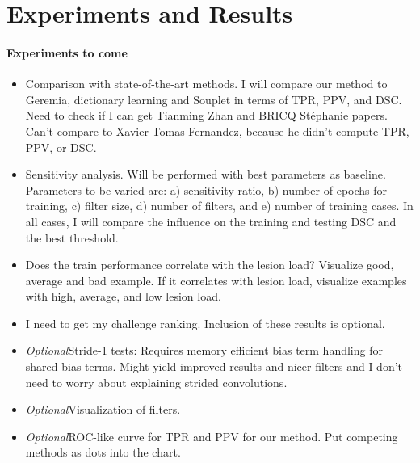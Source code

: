 %

\section{Experiments and Results}

\paragraph{Experiments to come}

\begin{itemize}
  
\item Comparison with state-of-the-art methods. I will compare our method to
Geremia, dictionary learning and Souplet in terms of TPR, PPV, and DSC. Need to
check if I can get Tianming Zhan and  BRICQ St\'ephanie papers. Can't compare to
Xavier Tomas-Fernandez, because he didn't compute TPR, PPV, or DSC.

\item Sensitivity analysis. Will be performed with best parameters as baseline.
Parameters to be varied are: a) sensitivity ratio, b) number of epochs for
training, c) filter size, d) number of filters, and e) number of training cases.
In all cases, I will compare the influence on the training and testing DSC and
the best threshold.

\item Does the train performance correlate with the lesion load? Visualize good,
average and bad example. If it correlates with lesion load, visualize examples
with high, average, and low lesion load.

\item I need to get my challenge ranking. Inclusion of these results is
optional.

\item \emph{Optional}\quad Stride-1 tests: Requires memory efficient bias term
handling for shared bias terms. Might yield improved results and nicer filters
and I don't need to worry about explaining strided convolutions.

\item \emph{Optional}\quad Visualization of filters.

\item \emph{Optional}\quad ROC-like curve for TPR and PPV for our method. Put
competing methods as dots into the chart.

\end{itemize}

